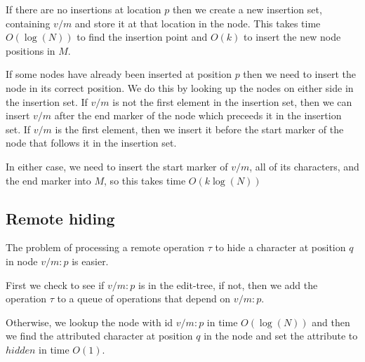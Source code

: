 \documentclass{amsart}
\begin{document}
If there are no insertions at location $p$
then we create a new insertion set, containing $v/m$ and
store it at that location in the node.
This takes time $O(\log(N))$ to find the insertion point
and $O(k)$ to insert the new node positions in $M$.


If some nodes have already been inserted at position $p$ then we need to insert the
node in its correct position. We do this by looking up the nodes on either 
side in the insertion set. If $v/m$ is not the first element in
the insertion set, then we can insert $v/m$ after the end marker of the node
which preceeds it in the insertion set. If $v/m$ is the first element,
then we insert it before the start marker of the node that follows it in
the insertion set.

In either case, we need to insert the start marker of $v/m$, all of its
characters, and the end marker into $M$, so this takes time $O(k\log(N))$


\subsection{Remote hiding}
The problem of processing a remote operation $\tau$ to hide 
a character at position $q$ in node $v/m:p$ is easier.

First we check to see if $v/m:p$ is in the edit-tree, if not, then we
add the operation $\tau$ to a queue of operations that depend on $v/m:p$.

Otherwise, we lookup the node with id $v/m:p$ in time $O(\log(N))$ and
then we find the attributed character at position $q$ in the node
and set the attribute to $hidden$ in time $O(1)$.
\end{document}
